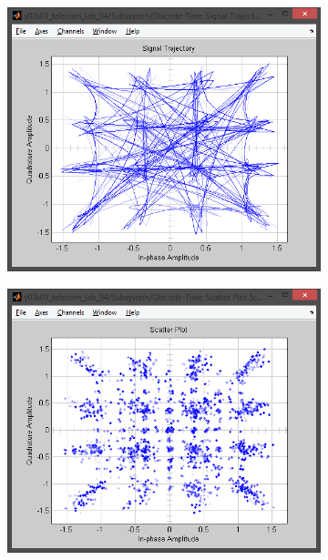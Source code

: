 \documentclass[
	a4paper,
	oneside,
	BCOR = 10mm,
	DIV = 12,
	12pt,
	headings = normal,
]{scrartcl}
\begin{document}
\begin{figure}[!htbp]
\begin{subfigure}{\textwidth / 3}
						\caption{}
						\label{subfig:rolloff-0p8-eye-out}
					\end{subfigure}%
					\begin{subfigure}{\textwidth / 3}
						\centering
						\includegraphics[height = 7\baselineskip]{../01-solution/rolloff-0p8-signal-trajectory-out.png}
						\caption{}
						\label{subfig:rolloff-0p8-signal-trajectory-out}
					\end{subfigure}%
					\begin{subfigure}{\textwidth / 3}
						\centering
						\includegraphics[height = 7\baselineskip]{../01-solution/rolloff-0p8-scatter-plot-out.png}

\end{subfigure}
\end{figure}
\end{document}

